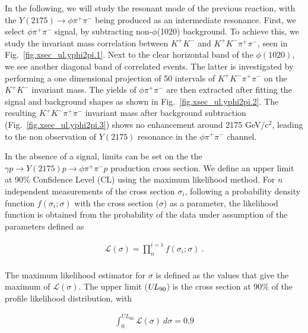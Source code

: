 In the following, we will study the resonant mode of the previous reaction, with the $Y(2175) \rightarrow \phi \pi^{+} \pi^{-}$ being produced as an intermediate resonance. First, we select $\phi \pi^+ \pi^-$ signal, by subtracting non-$\phi$(1020) background. To achieve this, we study the invariant mass correlation between $K^{+}K^{-}$ and $K^{+}K^{-} \pi^+ \pi^-$, seen in Fig.~\ref{fig.xsec_ul.yphi2pi.1}. Next to the clear horizontal band of the $\phi(1020)$, we see another diagonal band of correlated events. The latter is investigated by performing a one dimensional projection of 50 intervals of $K^{+}K^{-} \pi^+ \pi^-$ on the $K^{+}K^{-}$ invariant mass. The yields of $\phi \pi^+ \pi^-$ are then extracted after fitting the signal and background shapes as shown in Fig.~\ref{fig.xsec_ul.yphi2pi.2}. The resulting $K^{+}K^{-} \pi^+ \pi^-$ invariant mass after background subtraction (Fig.~\ref{fig.xsec_ul.yphi2pi.3}) shows no enhancement around 2175 GeV/c$^2$, leading to the non observation of $Y(2175)$ resonance in the $\phi \pi^+ \pi^-$ channel. 
~\par In the absence of a signal, limits can be set on the the $\gamma p \rightarrow Y(2175) p \rightarrow \phi \pi^{+} \pi^{-} p$ production cross section. We define an upper limit at 90$\%$ Confidence Level (CL) using the maximum likelihood method. For $n$ independent measurements of the cross section $\sigma_{i}$, following a probability density function $f(\sigma_{i};\sigma)$ with the cross section ($\sigma$) as a parameter, the likelihood function is obtained from the probability of the data under assumption of the parameters defined as

\begin{equation}
    \label{eq.xsec_ul.yphi2pi.1}
    \begin{aligned}
        \mathcal{L(\sigma)} = \prod_{n}^{i=1} f(\sigma_{i};\sigma)~.\\
    \end{aligned}
\end{equation}

\noindent The maximum likelihood estimator for $\sigma$ is defined as the values that give the maximum of $\mathcal{L(\sigma)}$. The upper limit ($U\kern-0.14em L_{90}$) is the cross section at 90$\%$ of the profile likelihood distribution, with

\begin{equation}
    \label{eq.xsec_ul.yphi2pi.2}
    \begin{aligned}
        \int_{0}^{UL_{90}} \mathcal{L}(\sigma)~d\sigma = 0.9 \\
    \end{aligned}
\end{equation}

